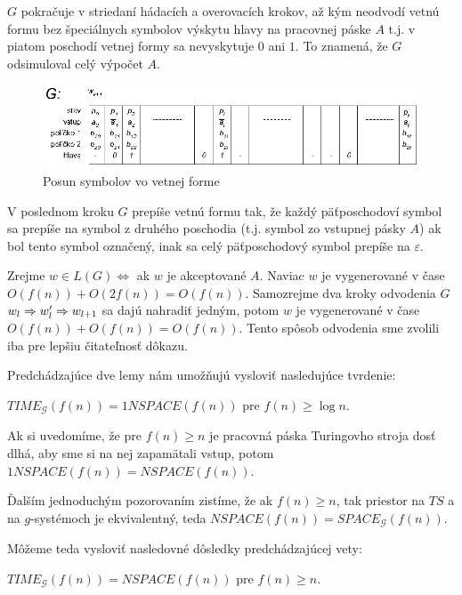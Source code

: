 \begin{dokaz}
$G$ pokračuje v striedaní hádacích a overovacích krokov, až kým
neodvodí vetnú formu bez špeciálnych symbolov výskytu hlavy na
pracovnej páske $A$ t.j. v piatom poschodí vetnej formy sa
nevyskytuje $0$ ani $1$. To znamená, že $G$ odsimuloval celý
výpočet $A$.

\begin{figure}[!ht]
  \centering
  \includegraphics{img/gsystems/time_g2}
  \caption{Posun symbolov vo vetnej forme} \label{gs_obr_time_g2}
\end{figure}

V poslednom kroku $G$ prepíše vetnú formu tak, že každý
päťposchodoví symbol sa prepíše na symbol z druhého poschodia
(t.j. symbol zo vstupnej pásky $A$) ak bol tento symbol označený,
inak sa celý päťposchodový symbol prepíše na $\varepsilon$.

Zrejme $w\in L(G)\Longleftrightarrow$ ak $w$ je akceptované $A$.
Naviac $w$ je vygenerované v čase\newline
$O(f(n))+O(2f(n))=O(f(n))$. Samozrejme dva kroky odvodenia $G$
$w_l\Rightarrow w_l'\Rightarrow w_{l+1}$ sa dajú nahradiť jedným, potom $w$ je
vygenerované v čase $O(f(n))+O(f(n))=O(f(n))$. Tento spôsob
odvodenia sme zvolili iba pre lepšiu čitateľnosť dôkazu.
\end{dokaz}

\medskip
Predchádzajúce dve lemy nám umožňujú vysloviť nasledujúce tvrdenie:

\begin{veta}
$TIME_{\mathcal{G}}(f(n))=1NSPACE(f(n))$ pre $f(n)\geq\log n$.
\end{veta}

Ak si uvedomíme, že pre $f(n)\geq n$ je pracovná páska Turingovho
stroja dosť dlhá, aby sme si na nej zapamätali vstup, potom
$1NSPACE(f(n))=NSPACE(f(n))$.

Ďalším jednoduchým pozorovaním zistíme, že ak $f(n)\geq n$, tak
priestor na $TS$ a na $g$-systémoch je ekvivalentný, teda
$NSPACE(f(n))=SPACE_{\mathcal{G}}(f(n))$.

Môžeme teda vysloviť nasledovné dôsledky predchádzajúcej vety:

\begin{dosledok}
$TIME_{\mathcal{G}}(f(n))=NSPACE(f(n))$ pre $f(n)\geq n$.
\end{dosledok}

